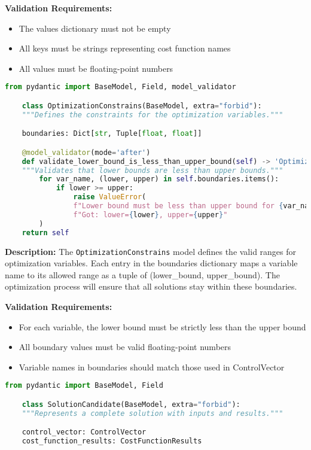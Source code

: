 \textbf{Validation Requirements:}
\begin{itemize}
	\item The values dictionary must not be empty
	\item All keys must be strings representing cost function names
	\item All values must be floating-point numbers
\end{itemize}

\begin{lstlisting}[language=Python, caption={OptimizationConstrains model with validation logic}]
	from pydantic import BaseModel, Field, model_validator

	class OptimizationConstrains(BaseModel, extra="forbid"):
	"""Defines the constraints for the optimization variables."""

	boundaries: Dict[str, Tuple[float, float]]

	@model_validator(mode='after')
	def validate_lower_bound_is_less_than_upper_bound(self) -> 'OptimizationConstrains':
	"""Validates that lower bounds are less than upper bounds."""
		for var_name, (lower, upper) in self.boundaries.items():
			if lower >= upper:
				raise ValueError(
				f"Lower bound must be less than upper bound for {var_name}. "
				f"Got: lower={lower}, upper={upper}"
		)
	return self
\end{lstlisting}


\textbf{Description:}
The \texttt{OptimizationConstrains} model defines the valid ranges for optimization variables. Each entry in the boundaries dictionary maps a variable name to its allowed range as a tuple of (lower\_bound, upper\_bound). The optimization process will ensure that all solutions stay within these boundaries.

\textbf{Validation Requirements:}
\begin{itemize}
	\item For each variable, the lower bound must be strictly less than the upper bound
	\item All boundary values must be valid floating-point numbers
	\item Variable names in boundaries should match those used in ControlVector
\end{itemize}

\begin{lstlisting}[language=Python, caption={SolutionCandidate model definition}]
	from pydantic import BaseModel, Field

	class SolutionCandidate(BaseModel, extra="forbid"):
	"""Represents a complete solution with inputs and results."""

	control_vector: ControlVector
	cost_function_results: CostFunctionResults
\end{lstlisting}

